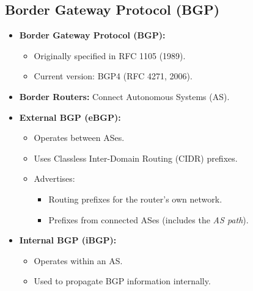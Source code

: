 \subsection{Border Gateway Protocol (BGP)}
\begin{itemize}
    \item \textbf{Border Gateway Protocol (BGP):}
    \begin{itemize}
        \item Originally specified in RFC 1105 (1989).
        \item Current version: BGP4 (RFC 4271, 2006).
    \end{itemize}
    \item \textbf{Border Routers:} Connect Autonomous Systems (AS).
    \item \textbf{External BGP (eBGP):}
    \begin{itemize}
        \item Operates between ASes.
        \item Uses Classless Inter-Domain Routing (CIDR) prefixes.
        \item Advertises:
        \begin{itemize}
            \item Routing prefixes for the router's own network.
            \item Prefixes from connected ASes (includes the \textit{AS path}).
        \end{itemize}
    \end{itemize}
    \item \textbf{Internal BGP (iBGP):}
    \begin{itemize}
        \item Operates within an AS.
        \item Used to propagate BGP information internally.
    \end{itemize}
\end{itemize}

